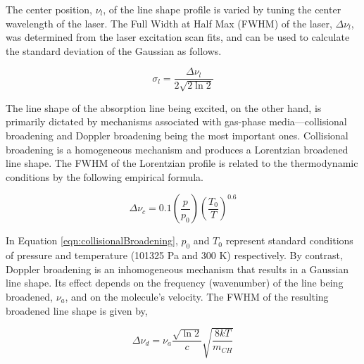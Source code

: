 The center position, \(\nu_l\), of the line shape profile is varied by tuning the center wavelength of the laser.
The Full Width at Half Max (FWHM) of the laser, \(\Delta\nu_l\), was determined from the laser excitation scan fits, and can be used to calculate the standard deviation of the Gaussian as follows.

\begin{equation}
  \sigma_l = \frac{\Delta\nu_l}{2 \sqrt{ 2 \ln{2} } }
\end{equation}


The line shape of the absorption line being excited, on the other hand, is primarily dictated by mechanisms associated with gas-phase media---collisional broadening and Doppler broadening being the most important ones.
Collisional broadening is a homogeneous mechanism and produces a Lorentzian broadened line shape.
The FWHM of the Lorentzian profile is related to the thermodynamic conditions by the following empirical formula.

\begin{equation}
  \Delta\nu_c = 0.1 \left(\frac{p}{p_0}\right) \left(\frac{T_0}{T}\right)^{0.6}
  \label{eqn:collisionalBroadening}
\end{equation}


In Equation \ref{eqn:collisionalBroadening}, \(p_0\) and \(T_0\) represent standard conditions of pressure and temperature (101325 Pa and 300 K) respectively.
By contrast, Doppler broadening is an inhomogeneous mechanism that results in a Gaussian line shape.
Its effect depends on the frequency (wavenumber) of the line being broadened, \(\nu_a\), and on the molecule's velocity.
The FWHM of the resulting broadened line shape is given by,

\begin{equation}
  \Delta\nu_d = \nu_a \frac{\sqrt{ \ln 2 } }{c} \sqrt{\frac{8kT}{m_{CH}}}
  \label{eqn:dopplerBroadening}
\end{equation}


